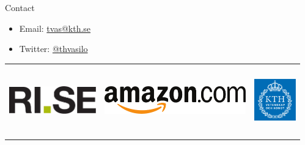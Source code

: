 \documentclass[final]{beamer}
\newlength{\sepwid}
\newlength{\onecolwid}
\begin{document}
\begin{frame}[t]
\begin{columns}[t]
\begin{column}{\onecolwid}
\begin{alertblock}{Contact}
	\begin{itemize}
	\item Email: \href{mailto:tvas@kth.se}{tvas@kth.se}
	\item Twitter: \href{https://www.twitter.com/thvasilo}{@thvasilo}
	\end{itemize}
	
	\end{alertblock}
	
	\begin{center}
	\begin{tabular}{ccc}
	\includegraphics[height=2cm]{rise_logo_horizontal_cmyk.pdf} \hfill & 
	\includegraphics[height=2cm]{amazon} \hfill & \includegraphics[height=3cm]{kth}
	\end{tabular}
	\end{center}


\end{column} %

\begin{column}{\sepwid}\end{column} %

\end{columns} %

\end{frame} %
\end{document}
